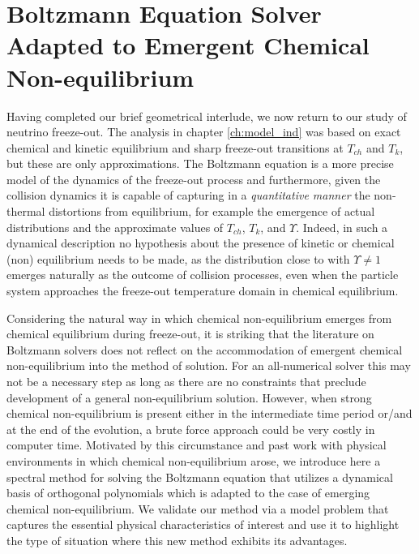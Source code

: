 \section{Boltzmann Equation Solver Adapted to Emergent Chemical Non-equilibrium}\label{ch:boltz_orthopoly}

Having completed our brief geometrical interlude, we now return to our study of neutrino freeze-out. The analysis in chapter \ref{ch:model_ind} was based on exact chemical and kinetic equilibrium and sharp freeze-out transitions at $T_{ch}$ and $T_k$, but these are  only approximations.  The  Boltzmann equation is a more precise model of the dynamics of the freeze-out process and furthermore, given the collision dynamics it is capable of capturing in a {\em quantitative manner} the non-thermal distortions from equilibrium, for example the emergence of actual distributions and the approximate values  of $T_{ch}$, $T_k$, and $\Upsilon$.  Indeed,  in  such a dynamical description no hypothesis about the presence of kinetic or chemical (non) equilibrium needs to be made, as the distribution close to  with   $\Upsilon\ne  1$ emerges naturally as the outcome of collision processes, even when the particle system approaches the freeze-out temperature domain  in chemical equilibrium.

Considering the natural way in which chemical non-equilibrium emerges from chemical equilibrium during freeze-out, it is striking that the literature on Boltzmann solvers does not reflect on the accommodation of emergent chemical non-equilibrium into the method of solution. For an all-numerical solver this may not be a necessary step as long as there are no constraints that preclude development of a general non-equilibrium solution. However, when strong chemical non-equilibrium is present either in the intermediate time period or/and at the end of the evolution, a brute force approach could be very costly in computer time. Motivated by this circumstance and past work with physical environments in which chemical non-equilibrium arose,  we introduce here a  spectral method for solving the Boltzmann equation that utilizes a dynamical basis of orthogonal polynomials which is adapted to the case of emerging chemical non-equilibrium. We validate our method via a  model problem  that captures the essential physical characteristics of interest and use it to highlight the type of situation where this new method exhibits its advantages.

